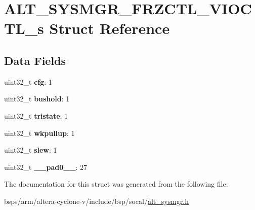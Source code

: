 \hypertarget{structALT__SYSMGR__FRZCTL__VIOCTL__s}{}\section{A\+L\+T\+\_\+\+S\+Y\+S\+M\+G\+R\+\_\+\+F\+R\+Z\+C\+T\+L\+\_\+\+V\+I\+O\+C\+T\+L\+\_\+s Struct Reference}
\label{structALT__SYSMGR__FRZCTL__VIOCTL__s}
\subsection*{Data Fields}
\begin{DoxyCompactItemize}
\item 
\mbox{\label{structALT__SYSMGR__FRZCTL__VIOCTL__s_ac0b6dff9d3330a76ff7834ecd3bd6272}} 
uint32\+\_\+t {\bfseries cfg}\+: 1
\item 
\mbox{\label{structALT__SYSMGR__FRZCTL__VIOCTL__s_a83d4b245dbf97bf1121836f6e7dac23c}} 
uint32\+\_\+t {\bfseries bushold}\+: 1
\item 
\mbox{\label{structALT__SYSMGR__FRZCTL__VIOCTL__s_a8186e32002fe5a4dbdb7a5f47b6e538c}} 
uint32\+\_\+t {\bfseries tristate}\+: 1
\item 
\mbox{\label{structALT__SYSMGR__FRZCTL__VIOCTL__s_a14116e70a8eafcf8d6e8c495e84f80d1}} 
uint32\+\_\+t {\bfseries wkpullup}\+: 1
\item 
\mbox{\label{structALT__SYSMGR__FRZCTL__VIOCTL__s_a5abadd8ecb5116ee270c1f83f4188482}} 
uint32\+\_\+t {\bfseries slew}\+: 1
\item 
\mbox{\label{structALT__SYSMGR__FRZCTL__VIOCTL__s_a3be79a8ad7f52068a2cce5168a641b29}} 
uint32\+\_\+t {\bfseries \+\_\+\+\_\+pad0\+\_\+\+\_\+}\+: 27
\end{DoxyCompactItemize}


The documentation for this struct was generated from the following file\+:\begin{DoxyCompactItemize}
\item 
bsps/arm/altera-\/cyclone-\/v/include/bsp/socal/\mbox{\hyperlink{alt__sysmgr_8h}{alt\+\_\+sysmgr.\+h}}\end{DoxyCompactItemize}
